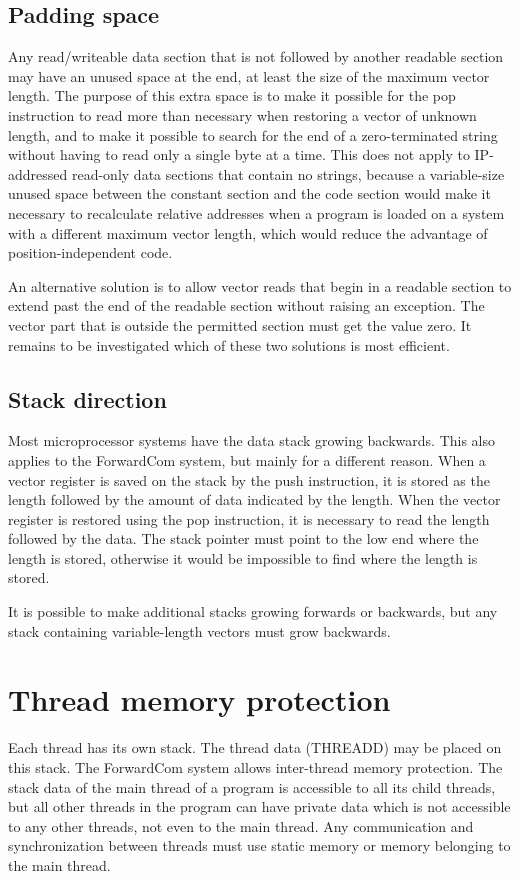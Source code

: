 \documentclass[forwardcom.tex]{subfiles}
\begin{document}
\subsection{Padding space} \label{PaddingSpace}
Any read/writeable data section that is not followed by another readable section may have an unused space at the end, at least the size of the maximum vector length. The purpose of this extra space is to make it possible for the pop instruction to read more than necessary when restoring a vector of unknown length, and to make 
it possible to search for the end of a zero-terminated string without having to read only a single byte at a time. This does not apply to IP-addressed read-only data sections that contain no strings, because a variable-size unused space between the constant section and the code section would make it necessary to recalculate relative addresses when a program is loaded on a system with a different maximum vector length, which would reduce the advantage of position-independent code.
\vv

An alternative solution is to allow vector reads that begin in a readable section to extend past the end of the readable section without raising an exception. The vector part that is outside the permitted section must get the value zero. It remains to be investigated which of these two solutions is most efficient.
\vv

\subsection{Stack direction} \label{StackDirection}
Most microprocessor systems have the data stack growing backwards. This also applies to the ForwardCom system, but mainly for a different reason. When a vector register is saved on the stack by the push instruction, it is stored as the length followed by the amount of data indicated by the length. When the vector register is restored using the pop instruction, it is necessary to read the length followed by the data. The stack pointer must point to the low end where the length is stored, otherwise it would be impossible to find where the length is stored. 
\vv

It is possible to make additional stacks growing forwards or backwards, but any stack containing variable-length vectors must grow backwards.
\vv

\section{Thread memory protection} \label{threadMemoryProtection}
Each thread has its own stack. The thread data (THREADD) may be placed on this stack. The ForwardCom system allows inter-thread memory protection. The stack data of the main thread of a program is accessible to all its child threads, but all other threads in the program can have private data which is not accessible to any other threads, not even to the main thread. Any communication and synchronization between threads must use static memory or memory belonging to the main thread. 
\vv
\end{document}
